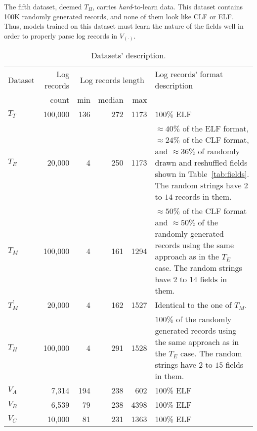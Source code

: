 \documentclass{article}
\begin{document}
The fifth dataset, deemed $T_H$, carries \textit{hard}-to-learn data. 
This dataset contains 100K randomly generated records, and none of them look like CLF or ELF. Thus, models trained on this dataset must learn the nature of the fields well in order to properly parse log records in $V_{(\cdot)}$.


\begin{table*}[bt]
\caption{ Datasets' description.}
\label{tab:datasets}
\centering
\begin{tabular}{@{}lrrrrp{}@{}}
\toprule
Dataset & Log records&  \multicolumn{3}{c}{Log records length}   & Log records' format description \\
  \cmidrule{3-5}
 & count & min & median & max  &   \\
\midrule
$T_T$  & 100,000 & 136 & 272 & 1173              & $100\%$ ELF  \\
$T_E$  & 20,000 & 4 & 250 & 1173              & $\approx 40\%$ of the ELF format, $\approx 24\%$ of the CLF format, and $\approx 36\%$ of randomly drawn and reshuffled fields shown in Table~\ref{tab:fields}.  The random strings have $2$ to $14$ records in them.  \\
$T_M$  & 100,000 & 4 & 161 & 1294              & $\approx 50\%$ of the CLF format and $\approx 50\%$  of the randomly generated records using the same approach as in the $T_E$ case. The random strings have $2$ to $14$ fields in them.    \\
$T_M^\prime$  & 20,000 & 4 & 162 & 1527              &  Identical to the one of $T_M$.  \\
$T_H$  & 100,000 & 4 & 291 & 1528              & $100\%$ of the randomly generated records using the same approach as in the $T_E$ case. The random strings have $2$ to $15$ fields in them.    \\
\midrule
$V_A$  & 7,314 & 194 & 238 & 602 & 100\% ELF                                \\
$V_B$  & 6,539 & 79 & 238 & 4398 & 100\% ELF                                \\
$V_C$  & 10,000 & 81 & 231 & 1363  & 100\% ELF                                \\ 
\bottomrule
\end{tabular}
\end{table*}
\end{document}
